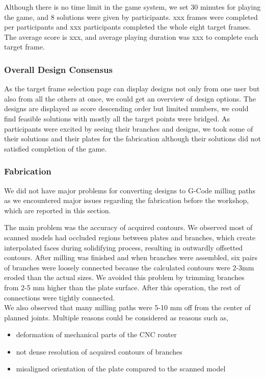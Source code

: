 Although there is no time limit in the game system, we set 30 minutes for playing the game, and 8 solutions were given by participants.
xxx frames were completed per participants and xxx participants completed the whole eight target frames.
The average score is xxx, and average playing duration was xxx to complete each target frame.

\subsubsection*{Overall Design Consensus }
As the target frame selection page can display designs not only from one user but also from all the others at once, we could get an overview of design options.
The designs are displayed as score descending order but limited numbers, we could find feasible solutions with mostly all the target points were bridged.
As participants were excited by seeing their branches and designs, we took some of their solutions and their plates for the fabrication although their solutions did not satisfied completion of the game.

\subsubsection*{Fabrication}
We did not have major problems for converting designs to G-Code milling paths as we encountered major issues regarding the fabrication before the workshop, which are reported in this section.

The main problem was the accuracy of acquired contours.
We observed most of scanned models had occluded regions between plates and branches, which create interpolated faces during solidifying process, resulting in outwardly offsetted contours.  After milling was finished and when branches were assembled, six pairs of branches were loosely connected because the calculated contours were 2-3mm eroded than the actual sizes.
We avoided this problem by trimming branches from 2-5 mm higher than the plate surface.
After this operation, the rest of connections were tightly connected. \\

We also observed that many milling paths were 5-10 mm off from the center of planned joints.
Multiple reasons could be considered as reasons such as,

\begin{itemize}
  \item{deformation of mechanical parts of the CNC router}
  \item{not dense resolution of acquired contours of branches}
  \item{misaligned orientation of the plate compared to the scanned model}
\end{itemize}

